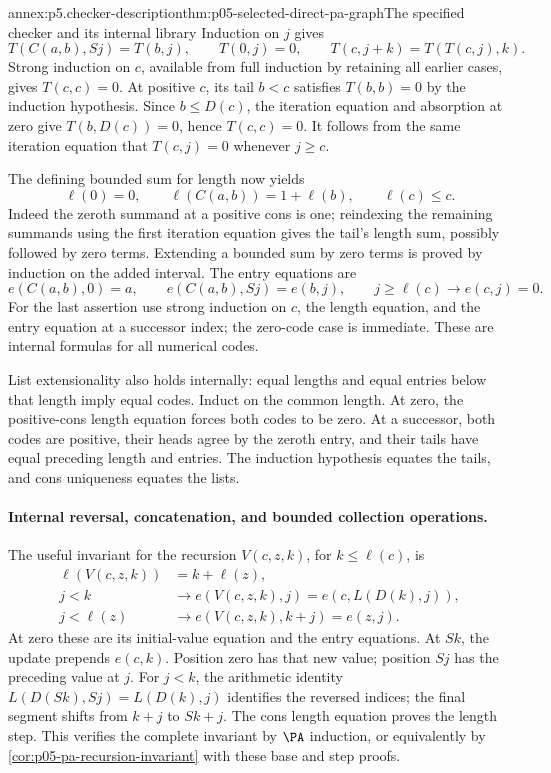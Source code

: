 \begin{annexitem}{annex:p5.checker-description}{thm:p05-selected-direct-pa-graph}{The specified checker and its internal library}
Induction on \(j\) gives
\[
 T(C(a,b),Sj)=T(b,j),\qquad T(0,j)=0,
 \qquad T(c,j+k)=T(T(c,j),k).
\]
Strong induction on \(c\), available from full induction by retaining all
earlier cases, gives \(T(c,c)=0\).  At positive \(c\), its tail
\(b<c\) satisfies \(T(b,b)=0\) by the induction hypothesis.  Since
\(b\leq D(c)\), the iteration equation and absorption at zero give
\(T(b,D(c))=0\), hence \(T(c,c)=0\).  It follows from the same
iteration equation that \(T(c,j)=0\) whenever \(j\geq c\).

The defining bounded sum for length now yields
\[
 \ell(0)=0,\qquad\ell(C(a,b))=1+\ell(b),\qquad\ell(c)\leq c.
\]
Indeed the zeroth summand at a positive cons is one; reindexing the remaining
summands using the first iteration equation gives the tail's length sum,
possibly followed by zero terms.  Extending a bounded sum by zero terms is
proved by induction on the added interval.  The entry equations are
\[
 e(C(a,b),0)=a,\qquad e(C(a,b),Sj)=e(b,j),\qquad
 j\geq\ell(c)\to e(c,j)=0.
\]
For the last assertion use strong induction on \(c\), the length equation,
and the entry equation at a successor index; the zero-code case is immediate.
These are internal formulas for all numerical codes.

List extensionality also holds internally: equal lengths and equal entries
below that length imply equal codes.  Induct on the common length.  At zero,
the positive-cons length equation forces both codes to be zero.  At a
successor, both codes are positive, their heads agree by the zeroth entry,
and their tails have equal preceding length and entries.  The induction
hypothesis equates the tails, and cons uniqueness equates the lists.

\paragraph{Internal reversal, concatenation, and bounded collection operations.}
The useful invariant for the recursion \(V(c,z,k)\), for
\(k\leq\ell(c)\), is
\[
\begin{aligned}
 \ell(V(c,z,k))&=k+\ell(z),\\
 j<k&\to e(V(c,z,k),j)=e(c,L(D(k),j)),\\
 j<\ell(z)&\to e(V(c,z,k),k+j)=e(z,j).
\end{aligned}
\]
At zero these are its initial-value equation and the entry equations.  At
\(Sk\), the update prepends \(e(c,k)\).  Position zero has that new
value; position \(Sj\) has the preceding value at \(j\).  For \(j<k\),
the arithmetic identity \(L(D(Sk),Sj)=L(D(k),j)\) identifies the reversed
indices; the final segment shifts from \(k+j\) to \(Sk+j\).  The cons
length equation proves the length step.  This verifies the complete invariant
by \(\PA\) induction, or equivalently by
\cref{cor:p05-pa-recursion-invariant} with these base and step proofs.


\end{annexitem}
